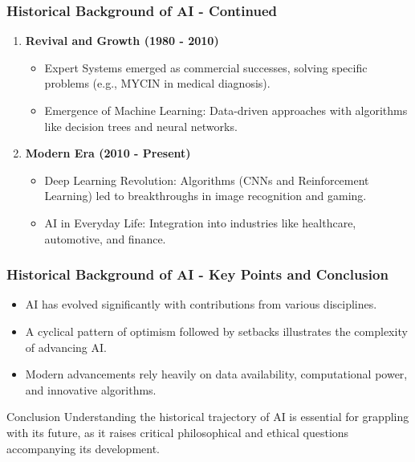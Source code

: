 \documentclass{beamer}
\begin{document}
\begin{frame}[fragile]
    \frametitle{Historical Background of AI - Continued}
    \begin{enumerate}[resume]
        \item \textbf{Revival and Growth (1980 - 2010)}
            \begin{itemize}
                \item Expert Systems emerged as commercial successes, solving specific problems (e.g., MYCIN in medical diagnosis).
                \item Emergence of Machine Learning: Data-driven approaches with algorithms like decision trees and neural networks.
            \end{itemize}

        \item \textbf{Modern Era (2010 - Present)}
            \begin{itemize}
                \item Deep Learning Revolution: Algorithms (CNNs and Reinforcement Learning) led to breakthroughs in image recognition and gaming.
                \item AI in Everyday Life: Integration into industries like healthcare, automotive, and finance.
            \end{itemize}
    \end{enumerate}
\end{frame}

\begin{frame}[fragile]
    \frametitle{Historical Background of AI - Key Points and Conclusion}
    \begin{itemize}
        \item AI has evolved significantly with contributions from various disciplines.
        \item A cyclical pattern of optimism followed by setbacks illustrates the complexity of advancing AI.
        \item Modern advancements rely heavily on data availability, computational power, and innovative algorithms.
    \end{itemize}
    \begin{block}{Conclusion}
        Understanding the historical trajectory of AI is essential for grappling with its future, as it raises critical philosophical and ethical questions accompanying its development.
    \end{block}
\end{frame}
\end{document}
